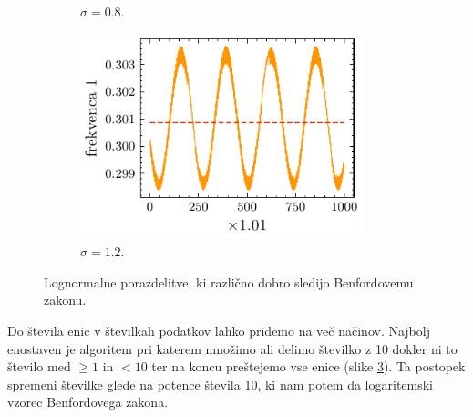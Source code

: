 \documentclass[11pt, oneside]{article}
\theoremstyle{definition}
\begin{document}
\begin{figure}[h!]
\begin{subfigure}[b]{0.49\textwidth}
        \caption{$\sigma=0.8$.}
        \label{fig: lognorm3}
    \end{subfigure}
    \hfill
    \begin{subfigure}[b]{0.49\textwidth}
        \centering
        \includegraphics[width=0.9\textwidth]{benford_lognorm_freq_1_mu12.pdf}
        \caption{$\sigma=1.2$.}
        \label{fig: lognorm4}
    \end{subfigure}
    \caption{Lognormalne porazdelitve, ki različno dobro sledijo Benfordovemu zakonu.}
    \label{fig: lognorm}
\end{figure}

\noindent
Do števila enic v številkah podatkov lahko pridemo na več načinov. Najbolj enostaven je algoritem pri katerem
množimo ali delimo številko z 10 dokler ni to število med $\geq1$ in $<10$ ter na koncu preštejemo vse
enice (slike \ref{fig: lognorm}).
Ta postopek spremeni številke glede na potence števila 10, ki nam potem da logaritemski vzorec Benfordovega zakona.
\end{document}
